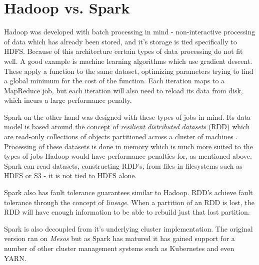\documentclass[conference]{IEEEtran}
\begin{document}
\section{Hadoop vs. Spark}
Hadoop was developed with batch processing in mind - non-interactive processing of data which has already been stored, and it's storage is tied specifically to HDFS. Because of this architecture certain types of data processing do not fit well. A good example is machine learning algorithms which use gradient descent. These apply a function to the same dataset, optimizing parameters trying to find a global minimum for the cost of the function. Each iteration maps to a MapReduce job, but each iteration will also need to reload its data from disk, which incurs a large performance penalty. 

Spark on the other hand was designed with these types of jobs in mind. Its data model is based around the concept of \emph{resilient distributed datasets} (RDD) which are read-only collections of objects partitioned across a cluster of machines \cite{spark} . Processing of these datasets is done in memory which is much more suited to the types of jobs Hadoop would have performance penalties for, as mentioned above. Spark can read datasets, constructing RDD's, from files in filesystems such as HDFS or S3 - it is not tied to HDFS alone. 

Spark also has fault tolerance guarantees similar to Hadoop. RDD's achieve fault tolerance through the concept of \emph{lineage}. When a partition of an RDD is lost, the RDD will have enough information to be able to rebuild just that lost partition.

Spark is also decoupled from it's underlying cluster implementation. The original version ran on \emph{Mesos} \cite{mesos} but as Spark has matured it has gained support for a number of other cluster management systems such as Kubernetes and even YARN.
\end{document}
